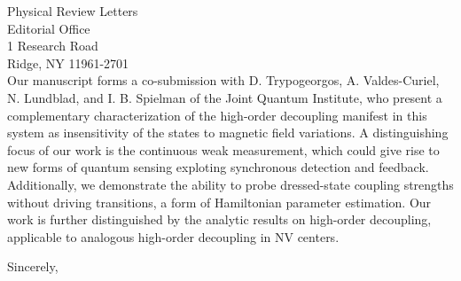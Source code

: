 \documentclass[10pt,letterpaper]{letter} %
\begin{document}
\begin{letter}{
	Physical Review Letters\\
	Editorial Office\\
	1 Research Road \\
	Ridge, NY 11961-2701\\
}
Our manuscript forms a co-submission with D. Trypogeorgos, A. Valdes-Curiel, N. Lundblad, and I. B. Spielman of the Joint Quantum Institute, who present a complementary characterization of the high-order decoupling manifest in this system as insensitivity of the states to magnetic field variations.
A distinguishing focus of our work is the continuous weak measurement, which could give rise to new forms of quantum sensing exploting synchronous detection and feedback.
Additionally, we demonstrate the ability to probe dressed-state coupling strengths without driving transitions, a form of Hamiltonian parameter estimation.
Our work is further distinguished by the analytic results on high-order decoupling, applicable to analogous high-order decoupling in NV centers.

\closing{Sincerely,}




\end{letter}
\end{document}
